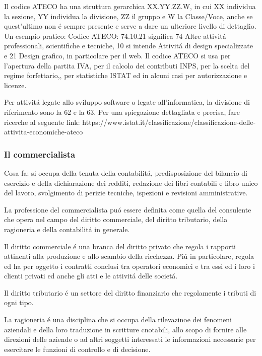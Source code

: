 \documentclass{article}
\begin{document}
Il codice ATECO ha una struttura gerarchica XX.YY.ZZ.W, in cui XX individua la sezione, YY individua la divisione, ZZ il gruppo e W la Classe/Voce, anche se quest'ultimo non \'e sempre presente e serve a dare un ulteriore livello di dettaglio. Un esempio pratico: Codice ATECO: 74.10.21 significa 74 Altre attivit\'a professionali, scientifiche e tecniche, 10 si intende Attivit\'a di design specializzate e 21 Design grafico, in particolare per il web. Il codice ATECO si usa per l'apertura della partita IVA, per il calcolo dei contributi INPS, per la scelta del regime forfettario,, per statistiche ISTAT ed in alcuni casi per autorizzazione e licenze.

Per attivit\'a legate allo sviluppo software o legate all'informatica, la divisione di riferimento sono la 62 e la 63. 
Per una spiegazione dettagliata e precisa, fare ricerche al seguente link: https://www.istat.it/classificazione/classificazione-delle-attivita-economiche-ateco

\subsubsection{Il commercialista}
Cosa fa: si occupa della tenuta della contabilit\'a, 
predisposizione del bilancio di esercizio e della dichiarazione dei redditi, 
redazione dei libri contabili e libro unico del lavoro, 
svolgimento di perizie tecniche, ispezioni e revisioni amministrative.

La professione del commercialista pu\'o essere definita come quella del consulente che opera 
nel campo del diritto commerciale, del diritto tributario, della ragioneria e della contabilit\'a in generale.

Il diritto commerciale \'e una branca del diritto privato che regola i rapporti attinenti alla produzione e allo scambio della ricchezza. Pi\'u in particolare, regola ed ha per oggetto i contratti conclusi tra operatori economici e tra essi ed i loro i clienti privati ed anche gli atti e le attivit\'a delle societ\'a. 

Il diritto tributario \'e un settore del diritto finanziario che regolamente i tributi di ogni tipo.

La ragioneria \'e una disciplina che si occupa della rilevazinoe dei fenomeni aziendali e della loro traduzione in scritture cnotabili, allo scopo di fornire alle direzioni delle aziende 
o ad altri soggetti interessati le informazioni necessarie per esercitare le funzioni di controllo e di decisione.
\end{document}
